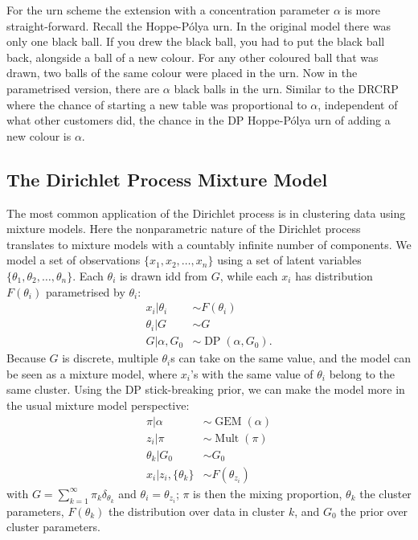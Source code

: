 For the urn scheme the extension with a concentration parameter $\alpha$ is more straight-forward. Recall the Hoppe-P\'olya urn. In the original model there was only one black ball. If you drew the black ball, you had to put the black ball back, alongside a ball of a new colour. For any other coloured ball that was drawn, two balls of the same colour were placed in the urn. Now in the parametrised version, there are $\alpha$ black balls in the urn. Similar to the DRCRP where the chance of starting a new table was proportional to $\alpha$, independent of what other customers did, the chance in the DP Hoppe-P\'olya urn of adding a new colour is $\alpha$.

\subsection{The Dirichlet Process Mixture Model}
The most common application of the Dirichlet process is in clustering data using mixture models\cite{Antoniak1974Mixtures,Escobar1995Bayesian}. Here the nonparametric nature of the Dirichlet process translates to mixture models with a countably infinite number of components. We model a set of observations $\{x_1, x_2, \ldots, x_n\}$ using a set of latent variables $\{\theta_1,\theta_2,\ldots,\theta_n\}$. Each $\theta_i$ is drawn idd from $G$, while each $x_i$ has distribution $F(\theta_i)$ parametrised by $\theta_i$:
\begin{align}
	x_i|\theta_i&\sim F(\theta_i) \\
    \theta_i|G&\sim G \\
    G|\alpha,G_0&\sim\operatorname{DP}(\alpha,G_0).
\end{align}
Because $G$ is discrete, multiple $\theta_i$s can take on the same value, and the model can be seen as a mixture model, where $x_i$'s with the same value of $\theta_i$ belong to the same cluster. Using the DP stick-breaking prior, we can make the model more in the usual mixture model perspective:
\begin{align}
	\pi|\alpha&\sim\operatorname{GEM}(\alpha) \\
    z_i|\pi&\sim\operatorname{Mult}(\pi) \\
    \theta_k|G_0&\sim G_0 \\
    x_i|z_i, \{\theta_k\}&\sim F(\theta_{z_i})
\end{align}
with $G = \sum_{k=1}^\infty \pi_k\delta_{\theta_k}$ and $\theta_i = \theta_{z_i}$; $\pi$ is then the mixing proportion, $\theta_k$ the cluster parameters, $F(\theta_k)$ the distribution over data in cluster $k$, and $G_0$ the prior over cluster parameters.

